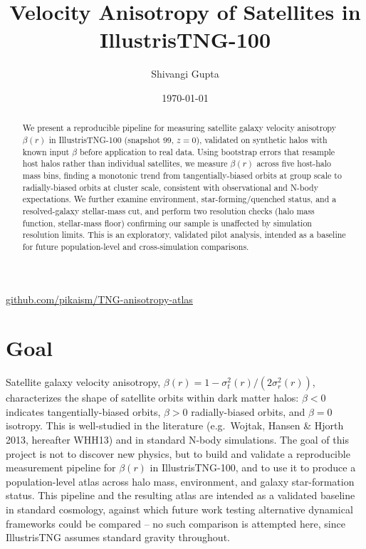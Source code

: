 \documentclass[11pt]{article}
\title{Velocity Anisotropy of Satellites in IllustrisTNG-100}
\author{Shivangi Gupta}
\date{\today}
\begin{document}
\maketitle

\begin{center}
\href{https://github.com/pikaism/TNG-anisotropy-atlas}{github.com/pikaism/TNG-anisotropy-atlas}
\end{center}

\begin{abstract}
We present a reproducible pipeline for measuring satellite galaxy
velocity anisotropy $\beta(r)$ in IllustrisTNG-100 (snapshot 99,
$z=0$), validated on synthetic halos with known input $\beta$ before
application to real data. Using bootstrap errors that resample host
halos rather than individual satellites, we measure $\beta(r)$ across
five host-halo mass bins, finding a monotonic trend from
tangentially-biased orbits at group scale to radially-biased orbits at
cluster scale, consistent with observational and N-body expectations.
We further examine environment, star-forming/quenched status, and a
resolved-galaxy stellar-mass cut, and perform two resolution checks
(halo mass function, stellar-mass floor) confirming our sample is
unaffected by simulation resolution limits. This is an exploratory,
validated pilot analysis, intended as a baseline for future
population-level and cross-simulation comparisons.
\end{abstract}

\section{Goal}

Satellite galaxy velocity anisotropy,
$\beta(r) = 1 - \sigma_t^2(r) / (2\sigma_r^2(r))$,
characterizes the shape of satellite orbits within dark matter halos:
$\beta < 0$ indicates tangentially-biased orbits, $\beta > 0$ radially-biased
orbits, and $\beta = 0$ isotropy. This is well-studied in the literature
(e.g.\ Wojtak, Hansen \& Hjorth 2013, hereafter WHH13) and in standard
N-body simulations. The goal of this project is not to discover new
physics, but to build and validate a reproducible measurement pipeline
for $\beta(r)$ in IllustrisTNG-100, and to use it to produce a
population-level atlas across halo mass, environment, and galaxy
star-formation status. This pipeline and the resulting atlas are
intended as a validated baseline in standard cosmology, against which
future work testing alternative dynamical frameworks could be
compared -- no such comparison is attempted here, since IllustrisTNG
assumes standard gravity throughout.
\end{document}
